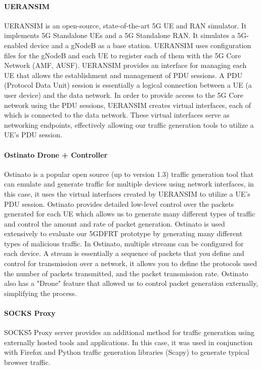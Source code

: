 \documentclass[final,1p,times,authoryear]{elsarticle}
\begin{document}
\paragraph{UERANSIM}
\label{sub3sub6sec3par1}
UERANSIM is an open-source, state-of-the-art 5G UE and RAN simulator. It implements 5G Standalone UEs and a 5G Standalone RAN. It simulates a 5G-enabled device and a gNodeB as a base station. UERANSIM uses configuration files for the gNodeB and each UE to register each of them with the 5G Core Network (AMF, AUSF). UERANSIM provides an interface for managing each UE that allows the establishment and management of PDU sessions. A PDU (Protocol Data Unit) session is essentially a logical connection between a UE (a user device) and the data network. In order to provide access to the 5G Core network using the PDU sessions, UERANSIM creates virtual interfaces, each of which is connected to the data network. These virtual interfaces serve as networking endpoints, effectively allowing our traffic generation tools to utilize a UE's PDU session.

\paragraph{Ostinato Drone + Controller}
\label{sub3sub6sec3par2}
Ostinato is a popular open source (up to version 1.3) traffic generation tool that can emulate and generate traffic for multiple devices using network interfaces, in this case, it uses the virtual interfaces created by UERANSIM to utilize a UE's PDU session. Ostinato provides detailed low-level control over the packets generated for each UE which allows us to generate many different types of traffic and control the amount and rate of packet generation. Ostinato is used extensively to evaluate our 5GDFRT prototype by generating many different types of malicious traffic. In Ostinato, multiple streams can be configured for each device. A stream is essentially a sequence of packets that you define and control for transmission over a network, it allows you to define the protocols used the number of packets transmitted, and the packet transmission rate. Ostinato also has a "Drone" feature that allowed us to control packet generation externally, simplifying the process.

\paragraph{SOCKS Proxy}
\label{sub3sub6sec3par3}
SOCKS5 Proxy server provides an additional method for traffic generation using externally hosted tools and applications. In this case, it was used in conjunction with Firefox and Python traffic generation libraries (Scapy) to generate typical browser traffic.
\end{document}
